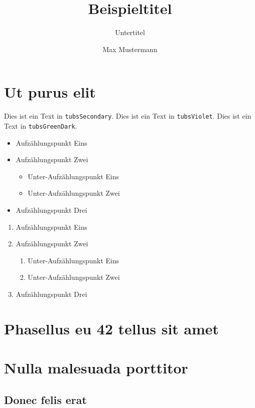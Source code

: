 \documentclass[%
  a4paper,%
  11pt,%
  blue,%
  ]{tubsbook}
\title{Beispieltitel}
\subtitle{Untertitel}
\author{Max Mustermann}
\begin{document}
\maketitle[image,logo=right]%
\makebackpage[trisec]%

\tableofcontents


\chapter{Ut purus elit}

\textcolor{tubsSecondary}{Dies ist ein Text in \texttt{tubsSecondary}.}
\textcolor{tubsViolet}{Dies ist ein Text in \texttt{tubsViolet}.}
\textcolor{tubsGreenDark}{Dies ist ein Text in \texttt{tubsGreenDark}.}\bigskip

\lipsum[1]

\begin{itemize}
  \item Aufzählungspunkt Eins
  \item Aufzählungspunkt Zwei
    \begin{itemize}
      \item Unter-Aufzählungspunkt Eins
      \item Unter-Aufzählungspunkt Zwei
    \end{itemize}
  \item Aufzählungspunkt Drei
\end{itemize}

\lipsum[9-12]

\begin{enumerate}
  \item Aufzählungspunkt Eins
  \item Aufzählungspunkt Zwei
    \begin{enumerate}
      \item Unter-Aufzählungspunkt Eins
      \item Unter-Aufzählungspunkt Zwei
    \end{enumerate}
  \item Aufzählungspunkt Drei
\end{enumerate}


\lipsum[13-15]

\chapter{Phasellus eu 42 tellus sit amet}

\lipsum[2-5]

\chapter{Nulla malesuada porttitor}

\lipsum[1-3]

\section{Donec felis erat}

\lipsum[4-7]
\end{document}

